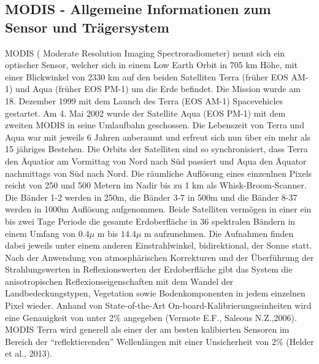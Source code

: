 \documentclass[11pt]{report}
\begin{document}
\subsection{MODIS - Allgemeine Informationen zum Sensor und Trägersystem}


MODIS ( Moderate Resolution Imaging Spectroradiometer) nennt sich ein optischer Sensor, welcher sich in einem Low Earth Orbit in 705 km Höhe, mit einer Blickwinkel von 2330 km auf den beiden Satelliten Terra (früher EOS AM-1) und Aqua (früher EOS PM-1) um die Erde befindet. Die Mission wurde am 18. Dezember 1999 mit dem Launch des Terra (EOS AM-1) Spacevehicles gestartet. Am 4. Mai 2002 wurde der Satellite Aqua (EOS PM-1) mit dem zweiten MODIS in seine Umlaufbahn geschossen. Die Lebenszeit von Terra und Aqua war mit jeweils 6 Jahren anberaumt und erfreut sich nun über ein mehr als 15 jähriges Bestehen. Die Orbits der Satelliten sind so synchronisiert, dass Terra den Äquatior am Vormittag von Nord nach Süd passiert und Aqua den Äquator nachmittags von Süd nach Nord. Die räumliche Auflösung eines einzenlnen Pixels reicht von 250 und 500 Metern im Nadir bis zu 1 km als Whisk-Broom-Scanner. Die Bänder 1-2 werden in 250m, die Bänder 3-7 in 500m und die Bänder 8-37 werden in 1000m Auflösung aufgenommen. Beide Satelliten vermögen in einer ein bis zwei Tage Periode die gesamte Erdoberfläche in 36 spektralen Bändern in einem Umfang von $0.4\mu$ m bis $14.4\mu$ m aufzunehmen. Die Aufnahmen finden dabei jeweils unter einem anderen Einstrahlwinkel, bidirektional,  der Sonne statt. Nach der Anwendung von atmosphärischen Korrekturen und der Überführung der Strahlungswerten in Reflexionswerten der Erdoberfläche gibt das System die anisotropischen Reflexionseigenschaften mit dem Wandel der Landbedeckungstypen, Vegetation sowie Bodenkomponenten  in jedem einzelnen Pixel wieder. Anhand von State-of-the-Art On-board-Kalibrierungseinheiten wird eine Genauigkeit von unter 2\% angegeben (Vermote E.F., Saleous N.Z.,2006). MODIS Terra wird generell als einer der am besten kalibierten Sensoren im Bereich der "`reflektierenden"' Wellenlängen mit einer Unsicherheit von 2\% (Helder et al., 2013).
\newline
\end{document}

